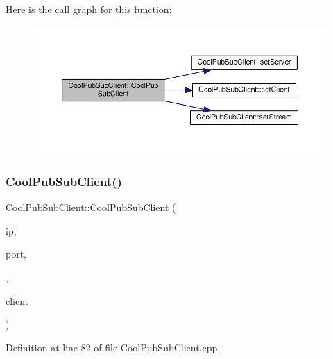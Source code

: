Here is the call graph for this function\+:
\nopagebreak
\begin{figure}[H]
\begin{center}
\leavevmode
\includegraphics[width=350pt]{class_cool_pub_sub_client_a3e7d7fa4b55e36f0ac8912335993d650_cgraph}
\end{center}
\end{figure}
\mbox{\label{class_cool_pub_sub_client_afc703702b40ba925377d0b9cd401319e}} 
\subsubsection{\texorpdfstring{Cool\+Pub\+Sub\+Client()}{CoolPubSubClient()}\hspace{0.1cm}{\footnotesize\ttfamily [9/14]}}
{\footnotesize\ttfamily Cool\+Pub\+Sub\+Client\+::\+Cool\+Pub\+Sub\+Client (\begin{DoxyParamCaption}\item[{uint8\+\_\+t $\ast$}]{ip,  }\item[{uint16\+\_\+t}]{port,  }\item[{\hyperlink{class_cool_pub_sub_client_a021ec75e9fbaf658370b8005ccfddc14}{M\+Q\+T\+T\+\_\+\+C\+A\+L\+L\+B\+A\+C\+K\+\_\+\+S\+I\+G\+N\+A\+T\+U\+RE}}]{,  }\item[{Client \&}]{client }\end{DoxyParamCaption})}



Definition at line 82 of file Cool\+Pub\+Sub\+Client.\+cpp.

